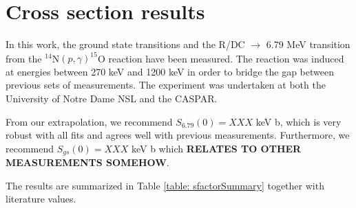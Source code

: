\section{Cross section results}
\label{sec: csResults}

In this work, the ground state transitions and the R/DC $\rightarrow$ 6.79 MeV transition from the $^{14}$N$(p,\gamma)^{15}$O reaction have been measured. The reaction was induced at energies between 270 keV and 1200 keV in order to bridge the gap between previous sets of measurements. The experiment was undertaken at both the University of Notre Dame NSL and the CASPAR.

From our extrapolation, we recommend $S_{6.79}(0) = XXX$ keV b, which is very robust with all fits and agrees well with previous measurements. Furthermore, we recommend $S_{gs}(0) = XXX$ keV b which \textbf{RELATES TO OTHER MEASUREMENTS SOMEHOW}. 

The results are summarized in Table \ref{table: sfactorSummary} together with literature values.



